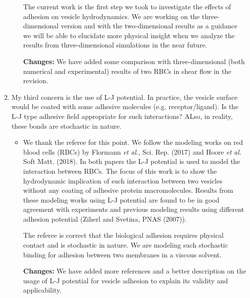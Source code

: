 \documentclass[11pt]{article}
\newcommand{\comment}[1]{{\color{blue} #1}}
\begin{document}
\begin{enumerate}
\begin{itemize}
  The current work is the first step we took to investigate the effects of adhesion on vesicle hydrodynamics. We are working on the three-dimensional version  and with the two-dimensional results as a guidance we will be able to elucidate more physical insight when we analyze the results from three-dimensional simulations in the near future.
  
  \noindent
  {\bf Changes:} We have added some comparison with three-dimensional (both numerical and experimental) results of two RBCs in shear flow in the revision.
\end{itemize}

\noindent
\item\comment{My third concern is the use of L-J potential. In practice, the
vesicle surface would be coated with some adhesive molecules (e.g.
receptor/ligand). Is the L-J type adhesive field appropriate for such
interactions? ALso, in reality, these bonds are stochastic in nature.}
\begin{itemize}
  \item We thank the referee for this point. We follow the modeling works on red blood cells (RBCs) by Flormann {\it et al.}, Sci. Rep. (2017) and Hoore {\it et al.} Soft Matt. (2018).
  In both papers the L-J potential is used to model the interaction between RBCs. The focus of this work is to show the hydrodynamic implication of such interaction between two vesicles without any coating of adhesive protein macromolecules. Results from these modeling works using L-J potential are found to be in good agreement with experiments and previous modeling results using different adhesion potential (Ziherl and Svetina, PNAS (2007)).
  
  The referee is correct that the biological adhesion requires physical contact and is stochastic in nature. We are modeling such stochastic binding for adhesion between two membranes in a viscous solvent.
  
  \noindent
  {\bf Changes:} We have added more references and a better description on the usage of L-J potential for vesicle adhesion to explain its validity and applicability.
  
\end{itemize}


\end{enumerate}
\end{document}
